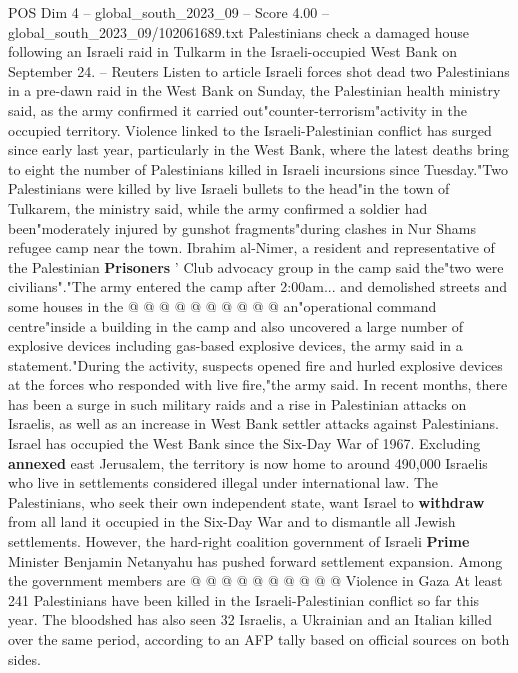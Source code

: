 \begin{textsample}{POS Dim 4 – global\_south\_2023\_09 – Score 4.00 – global\_south\_2023\_09/102061689.txt}  \label{ex:f4_pos_423}
Palestinians check a damaged house following an Israeli raid in Tulkarm in the Israeli-occupied West Bank on September 24. -- Reuters Listen to article Israeli forces shot dead two Palestinians in a pre-dawn raid in the West Bank on Sunday, the Palestinian health ministry said, as the army confirmed it carried out"counter-terrorism"activity in the occupied territory.
Violence linked to the Israeli-Palestinian conflict has surged since early last year, particularly in the West Bank, where the latest deaths bring to eight the number of Palestinians killed in Israeli incursions since Tuesday."Two Palestinians were killed by live Israeli bullets to the head"in the town of Tulkarem, the ministry said, while the army confirmed a soldier had been"moderately injured by gunshot fragments"during clashes in Nur Shams refugee camp near the town.
Ibrahim al-Nimer, a resident and representative of the Palestinian \textbf{Prisoners} ' Club advocacy group in the camp said the"two were civilians"."The army entered the camp after 2:00am... and demolished streets and some houses in the @ @ @ @ @ @ @ @ @ @ an"operational command centre"inside a building in the camp and also uncovered a large number of explosive devices including gas-based explosive devices, the army said in a statement."During the activity, suspects opened fire and hurled explosive devices at the forces who responded with live fire,"the army said.
In recent months, there has been a surge in such military raids and a rise in Palestinian attacks on Israelis, as well as an increase in West Bank settler attacks against Palestinians.
Israel has occupied the West Bank since the Six-Day War of 1967.
Excluding \textbf{annexed} east Jerusalem, the territory is now home to around 490,000 Israelis who live in settlements considered illegal under international law.
The Palestinians, who seek their own independent state, want Israel to \textbf{withdraw} from all land it occupied in the Six-Day War and to dismantle all Jewish settlements.
However, the hard-right coalition government of Israeli \textbf{Prime} Minister Benjamin Netanyahu has pushed forward settlement expansion.
Among the government members are @ @ @ @ @ @ @ @ @ @ Violence in Gaza At least 241 Palestinians have been killed in the Israeli-Palestinian conflict so far this year.
The bloodshed has also seen 32 Israelis, a Ukrainian and an Italian killed over the same period, according to an AFP tally based on official sources on both sides.

\end{textsample}
